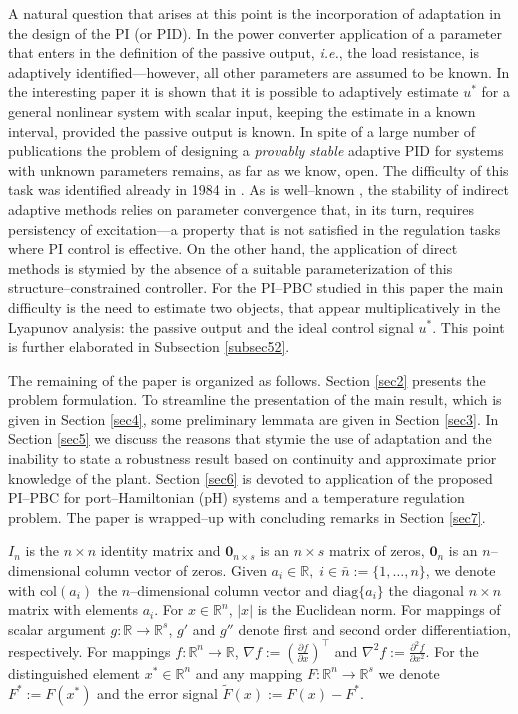 \documentclass[10pt, conference]{ieeeconf}
\newcommand{\col}{ \mbox{col} }
\def\rea{\mathbb{R}}
\def\diag{\mbox{diag}}
\begin{document}
A natural question that arises at this point is the incorporation of adaptation in the design of the PI (or PID). In the  power converter application of \cite{HERetal} a parameter that enters in the definition of the passive output, {\em i.e.}, the load resistance, is adaptively identified---however, all other parameters are assumed to be known. In the interesting paper \cite{ANTAST} it is shown that it is possible to adaptively estimate $u^*$ for a general nonlinear system with scalar input, keeping the estimate in a known interval, provided the passive output is known. In spite of a large number of publications the problem of designing a {\em provably stable} adaptive PID for systems with unknown parameters remains, as far as we know, open. The difficulty of this task was identified already in 1984 in \cite{ORTKEL}. As is well--known  \cite{SASBOD}, the stability of indirect adaptive methods relies on parameter convergence that, in its turn, requires persistency of excitation---a property that is not satisfied in the regulation tasks where PI control is effective. On the other hand, the application of direct methods is stymied by the absence of a suitable parameterization of this structure--constrained controller. For the PI--PBC studied in this paper the main difficulty is the need to estimate two objects, that appear multiplicatively in the Lyapunov analysis: the passive output and the ideal control signal  $u^*$. This point is further elaborated in Subsection \ref{subsec52}.

The remaining of the paper is organized as follows. Section \ref{sec2} presents the problem formulation. To streamline the presentation of the main result, which is given in  Section \ref{sec4}, some preliminary lemmata are given in Section \ref{sec3}. In Section \ref{sec5} we discuss the reasons that stymie the use of adaptation and the inability to state a robustness result based on continuity and approximate prior knowledge of the plant. Section \ref{sec6} is devoted to application of the proposed PI--PBC for port--Hamiltonian (pH) systems \cite{VAN}  and a temperature regulation problem. The paper is wrapped--up with concluding remarks in  Section \ref{sec7}.
\vspace{2mm}

 $I_n$ is the $n \times n$ identity matrix and $\mathbf{0}_{n \times s}$ is an
$n \times s$ matrix of zeros, $\mathbf{0}_n$ is an $n$--dimensional column vector of zeros. Given $a_i \in \rea,\; i \in \bar n := \{1,\dots,n\}$, we denote with $\col(a_i)$ the $n$--dimensional column vector and $\diag\{a_i\}$ the diagonal $n \times n$ matrix with
elements $a_i$. For $x \in \rea^n$,  $|x|$ is the Euclidean norm. For mappings of scalar argument $g:\rea \to \rea^s$, $g'$ and $g''$ denote first and second order differentiation, respectively. For mappings $f:\rea^n \to \rea$, $\nabla f :=
(\frac{\partial f}{\partial x})^\top$ and $\nabla^2 f:= \frac{\partial^2 f}{\partial x^2}$. For the distinguished element $x^* \in \rea^n$ and any mapping $F:\rea^n \to \rea^s$ we denote $F^*:=F(x^*)$ and the error signal  $\tilde F(x):=F(x)-F^*$. 
\end{document}
